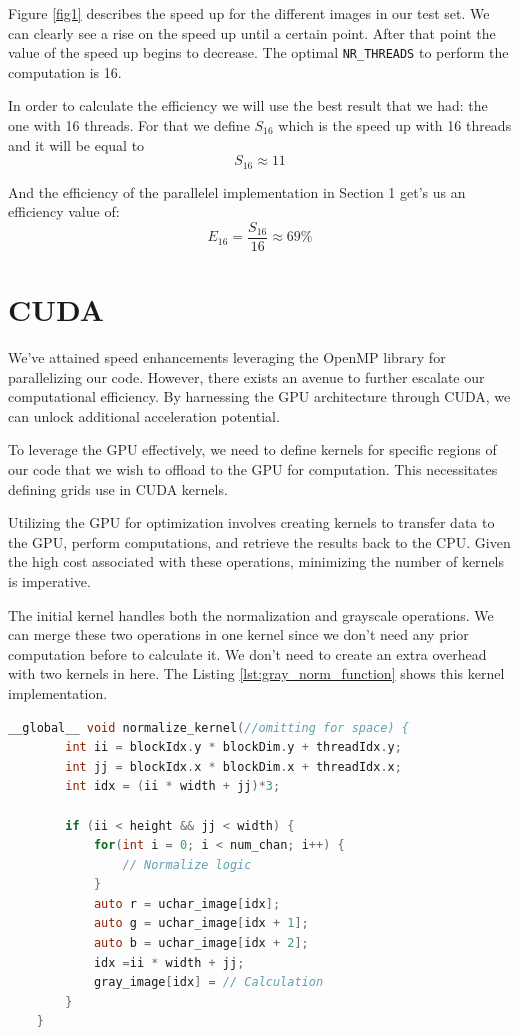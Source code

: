 \documentclass[sigconf]{acmart}
\begin{document}
Figure \ref{fig1} describes the speed up for the different images in our test set. We can clearly see a rise on the speed up until a certain point. After that point the value of the speed up begins to decrease. The optimal \texttt{NR\_THREADS} to perform the computation is 16.

In order to calculate the efficiency we will use the best result that we had: the one with 16 threads. For that we define $S_{16}$ which is the speed up with 16 threads and it will be equal to $$S_{16} \approx 11$$

And the efficiency of the parallelel implementation in Section 1 get's us an efficiency value of: $$E_{16} = \frac{S_{16}}{16} \approx 69\%$$

\section{CUDA}
We've attained speed enhancements leveraging the OpenMP library for parallelizing our code. However, there exists an avenue to further escalate our computational efficiency. By harnessing the GPU architecture through CUDA, we can unlock additional acceleration potential.

To leverage the GPU effectively, we need to define kernels for specific regions of our code that we wish to offload to the GPU for computation. This necessitates defining grids use in CUDA kernels.

Utilizing the GPU for optimization involves creating kernels to transfer data to the GPU, perform computations, and retrieve the results back to the CPU. Given the high cost associated with these operations, minimizing the number of kernels is imperative.

The initial kernel handles both the normalization and grayscale operations. We can merge these two operations in one kernel since we don't need any prior computation before to calculate it. We don't need to create an extra overhead with two kernels in here. The Listing \ref{lst:gray_norm_function} shows this kernel implementation.

\begin{lstlisting}[language=C, caption=Grey Conversion and Normalization, label={lst:gray_norm_function}]
__global__ void normalize_kernel(//omitting for space) {
        int ii = blockIdx.y * blockDim.y + threadIdx.y;
        int jj = blockIdx.x * blockDim.x + threadIdx.x;
        int idx = (ii * width + jj)*3;

        if (ii < height && jj < width) {
            for(int i = 0; i < num_chan; i++) {
                // Normalize logic
            }
            auto r = uchar_image[idx];
            auto g = uchar_image[idx + 1];
            auto b = uchar_image[idx + 2];
            idx =ii * width + jj;
            gray_image[idx] = // Calculation
        }
    }
\end{lstlisting}
\end{document}

